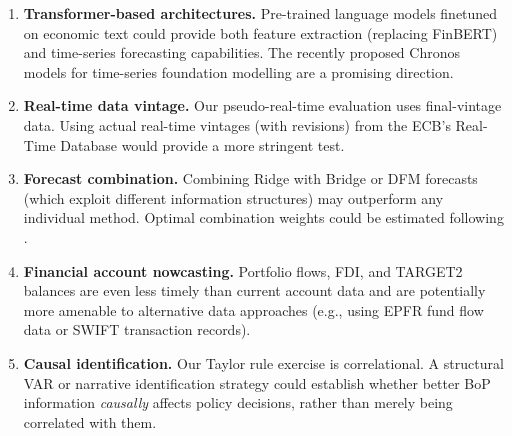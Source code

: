 \begin{enumerate}
  \item \textbf{Transformer-based architectures.}  Pre-trained language models finetuned on economic text \citep{devlin2019bert} could provide both feature extraction (replacing FinBERT) and time-series forecasting capabilities.  The recently proposed Chronos models for time-series foundation modelling are a promising direction.

  \item \textbf{Real-time data vintage.}  Our pseudo-real-time evaluation uses final-vintage data.  Using actual real-time vintages (with revisions) from the ECB's Real-Time Database would provide a more stringent test.

  \item \textbf{Forecast combination.}  Combining Ridge with Bridge or DFM forecasts (which exploit different information structures) may outperform any individual method.  Optimal combination weights could be estimated following \citet{stock2004combination}.

  \item \textbf{Financial account nowcasting.}  Portfolio flows, FDI, and TARGET2 balances are even less timely than current account data and are potentially more amenable to alternative data approaches (e.g., using EPFR fund flow data or SWIFT transaction records).

  \item \textbf{Causal identification.}  Our Taylor rule exercise is correlational.  A structural VAR or narrative identification strategy could establish whether better BoP information \emph{causally} affects policy decisions, rather than merely being correlated with them.
\end{enumerate}

